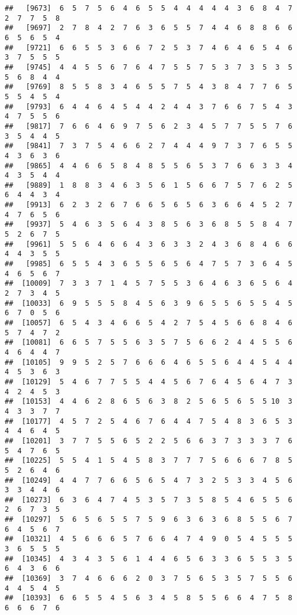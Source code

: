 \documentclass[
]{book}
\begin{document}
\begin{verbatim}
##   [9673]  6  5  7  5  6  4  6  5  5  4  4  4  4  4  3  6  8  4  7  2  7  7  5  8
##   [9697]  2  7  8  4  2  7  6  3  6  5  5  7  4  4  6  8  8  6  6  6  5  6  5  4
##   [9721]  6  6  5  5  3  6  6  7  2  5  3  7  4  6  4  6  5  4  6  3  7  5  5  5
##   [9745]  4  4  5  5  6  7  6  4  7  5  5  7  5  3  7  3  5  3  5  5  6  8  4  4
##   [9769]  8  5  5  8  3  4  6  5  5  7  5  4  3  8  4  7  7  6  5  5  5  4  5  4
##   [9793]  6  4  4  6  4  5  4  4  2  4  4  3  7  6  6  7  5  4  3  4  7  5  5  6
##   [9817]  7  6  6  4  6  9  7  5  6  2  3  4  5  7  7  5  5  7  6  3  5  4  4  5
##   [9841]  7  3  7  5  4  6  6  2  7  4  4  4  9  7  3  7  6  5  5  4  3  6  3  6
##   [9865]  4  4  6  6  5  8  4  8  5  5  6  5  3  7  6  6  3  3  4  4  3  5  4  4
##   [9889]  1  8  8  3  4  6  3  5  6  1  5  6  6  7  5  7  6  2  5  6  4  4  3  4
##   [9913]  6  2  3  2  6  7  6  6  5  6  5  6  3  6  6  4  5  2  7  4  7  6  5  6
##   [9937]  5  4  6  3  5  6  4  3  8  5  6  3  6  8  5  5  8  4  7  5  2  6  7  5
##   [9961]  5  5  6  4  6  6  4  3  6  3  3  2  4  3  6  8  4  6  6  4  4  3  5  5
##   [9985]  6  5  5  4  3  6  5  5  6  5  6  4  7  5  7  3  6  4  5  4  6  5  6  7
##  [10009]  7  3  3  7  1  4  5  7  5  5  3  6  4  6  3  6  5  6  4  2  7  3  4  5
##  [10033]  6  9  5  5  5  8  4  5  6  3  9  6  5  5  6  5  5  4  5  6  7  0  5  6
##  [10057]  6  5  4  3  4  6  6  5  4  2  7  5  4  5  6  6  8  4  6  5  7  4  7  2
##  [10081]  6  6  5  7  5  5  6  3  5  7  5  6  6  2  4  4  5  5  6  4  6  4  4  7
##  [10105]  9  9  5  2  5  7  6  6  6  4  6  5  5  6  4  4  5  4  4  4  5  3  6  3
##  [10129]  5  4  6  7  7  5  5  4  4  5  6  7  6  4  5  6  4  7  3  4  2  4  5  3
##  [10153]  4  4  6  2  8  6  5  6  3  8  2  5  6  5  6  5  5 10  3  4  3  3  7  7
##  [10177]  4  5  7  2  5  4  6  7  6  4  4  7  5  4  8  3  6  5  3  4  4  6  4  5
##  [10201]  3  7  7  5  5  6  5  2  2  5  6  6  3  7  3  3  3  7  6  5  4  7  6  5
##  [10225]  5  5  4  1  5  4  5  8  3  7  7  7  5  6  6  6  7  8  5  5  2  6  4  6
##  [10249]  4  4  7  7  6  6  5  6  5  4  7  3  2  5  3  3  4  5  6  3  3  4  4  6
##  [10273]  6  3  6  4  7  4  5  3  5  7  3  5  8  5  4  6  5  5  6  2  6  7  3  5
##  [10297]  5  6  5  6  5  5  7  5  9  6  3  6  3  6  8  5  5  6  7  6  4  5  6  7
##  [10321]  4  5  6  6  6  5  7  6  6  4  7  4  9  0  5  4  5  5  5  3  6  5  5  5
##  [10345]  4  3  4  3  5  6  1  4  4  6  5  6  3  3  6  5  5  3  5  6  4  3  6  6
##  [10369]  3  7  4  6  6  6  2  0  3  7  5  6  5  3  5  7  5  5  6  4  4  5  4  5
##  [10393]  6  6  5  5  4  5  6  3  4  5  8  5  5  6  6  4  7  5  8  6  6  6  7  6

\end{verbatim}
\end{document}
